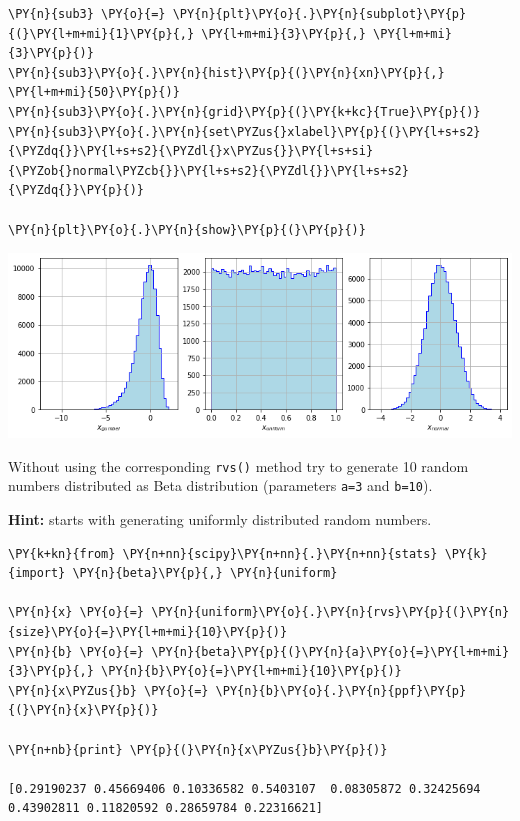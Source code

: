 \begin{Answer}
\begin{codebox}[size=fbox, boxrule=1pt, colback=cellbackground, colframe=cellborder]
\begin{Verbatim}[commandchars=\\\{\}]
\PY{n}{sub3} \PY{o}{=} \PY{n}{plt}\PY{o}{.}\PY{n}{subplot}\PY{p}{(}\PY{l+m+mi}{1}\PY{p}{,} \PY{l+m+mi}{3}\PY{p}{,} \PY{l+m+mi}{3}\PY{p}{)}
\PY{n}{sub3}\PY{o}{.}\PY{n}{hist}\PY{p}{(}\PY{n}{xn}\PY{p}{,} \PY{l+m+mi}{50}\PY{p}{)}
\PY{n}{sub3}\PY{o}{.}\PY{n}{grid}\PY{p}{(}\PY{k+kc}{True}\PY{p}{)}
\PY{n}{sub3}\PY{o}{.}\PY{n}{set\PYZus{}xlabel}\PY{p}{(}\PY{l+s+s2}{\PYZdq{}}\PY{l+s+s2}{\PYZdl{}x\PYZus{}}\PY{l+s+si}{\PYZob{}normal\PYZcb{}}\PY{l+s+s2}{\PYZdl{}}\PY{l+s+s2}{\PYZdq{}}\PY{p}{)}
	
\PY{n}{plt}\PY{o}{.}\PY{n}{show}\PY{p}{(}\PY{p}{)}
\end{Verbatim}
\end{codebox}

\begin{center}
\includegraphics{figures/ex_gumbel_to_gauss.png}
\end{center}
\end{Answer}

\begin{Exercise}[title={(Random Numbers)}]
Without using the corresponding \texttt{rvs()} method try to generate 10 random numbers distributed as Beta distribution (parameters \texttt{a=3} and \texttt{b=10}).

\textbf{Hint:} starts with generating uniformly distributed random numbers.
\end{Exercise}	

\begin{Answer}
\begin{codebox}[size=fbox, boxrule=1pt, colback=cellbackground, colframe=cellborder]
\begin{Verbatim}[commandchars=\\\{\}]
\PY{k+kn}{from} \PY{n+nn}{scipy}\PY{n+nn}{.}\PY{n+nn}{stats} \PY{k}{import} \PY{n}{beta}\PY{p}{,} \PY{n}{uniform}
		
\PY{n}{x} \PY{o}{=} \PY{n}{uniform}\PY{o}{.}\PY{n}{rvs}\PY{p}{(}\PY{n}{size}\PY{o}{=}\PY{l+m+mi}{10}\PY{p}{)}
\PY{n}{b} \PY{o}{=} \PY{n}{beta}\PY{p}{(}\PY{n}{a}\PY{o}{=}\PY{l+m+mi}{3}\PY{p}{,} \PY{n}{b}\PY{o}{=}\PY{l+m+mi}{10}\PY{p}{)}
\PY{n}{x\PYZus{}b} \PY{o}{=} \PY{n}{b}\PY{o}{.}\PY{n}{ppf}\PY{p}{(}\PY{n}{x}\PY{p}{)}
		
\PY{n+nb}{print} \PY{p}{(}\PY{n}{x\PYZus{}b}\PY{p}{)}

[0.29190237 0.45669406 0.10336582 0.5403107  0.08305872 0.32425694
0.43902811 0.11820592 0.28659784 0.22316621]
\end{Verbatim}
\end{codebox}
\end{Answer}

